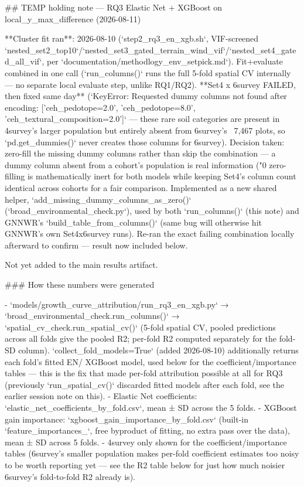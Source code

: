 ## TEMP holding note — RQ3 Elastic Net + XGBoost on local_y_max_difference (2026-08-11)

**Cluster fit ran**: 2026-08-10 (`step2_rq3_en_xgb.sh`, VIF-screened
`nested_set2_top10`/`nested_set3_gated_terrain_wind_vif`/`nested_set4_gated_all_vif`, per
`documentation/methodlogy_env_setpick.md`). Fit+evaluate combined in one call (`run_columns()`
runs the full 5-fold spatial CV internally — no separate local evaluate step, unlike RQ1/RQ2).
**Set4 x 6survey FAILED, then fixed same day** (`KeyError: Requested dummy columns not found
after encoding: ['ceh_pedotope=2.0', 'ceh_pedotope=8.0', 'ceh_textural_composition=2.0']` — these
rare soil categories are present in 4survey's larger population but entirely absent from
6survey's ~7,467 plots, so `pd.get_dummies()` never creates those columns for 6survey). Decision
taken: zero-fill the missing dummy columns rather than skip the combination — a dummy column
absent from a cohort's population is real information ("0%
zero-filling is mathematically inert for both models while keeping Set4's column count identical
across cohorts for a fair comparison. Implemented as a new shared helper,
`add_missing_dummy_columns_as_zero()` (`broad_environmental_check.py`), used by both
`run_columns()` (this note) and GNNWR's `build_table_from_columns()` (same bug will otherwise hit
GNNWR's own Set4x6survey runs). Re-ran the exact failing combination locally afterward to
confirm — result now included below.

Not yet added to the main results artifact.

### How these numbers were generated

- `models/growth_curve_attribution/run_rq3_en_xgb.py` → `broad_environmental_check.run_columns()`
  → `spatial_cv_check.run_spatial_cv()` (5-fold spatial CV, pooled predictions across all folds
  give the pooled R2; per-fold R2 computed separately for the fold-SD column).
  `collect_fold_models=True` (added 2026-08-10) additionally returns each fold's fitted EN/
  XGBoost model, used below for the coefficient/importance tables — this is the fix that made
  per-fold attribution possible at all for RQ3 (previously `run_spatial_cv()` discarded fitted
  models after each fold, see the earlier session note on this).
- Elastic Net coefficients: `elastic_net_coefficients_by_fold.csv`, mean ± SD across the 5 folds.
- XGBoost gain importance: `xgboost_gain_importance_by_fold.csv` (built-in `feature_importances_`,
  free byproduct of fitting, no extra pass over the data), mean ± SD across 5 folds.
- 4survey only shown for the coefficient/importance tables (6survey's smaller population makes
  per-fold coefficient estimates too noisy to be worth reporting yet — see the R2 table below for
  just how much noisier 6survey's fold-to-fold R2 already is).

